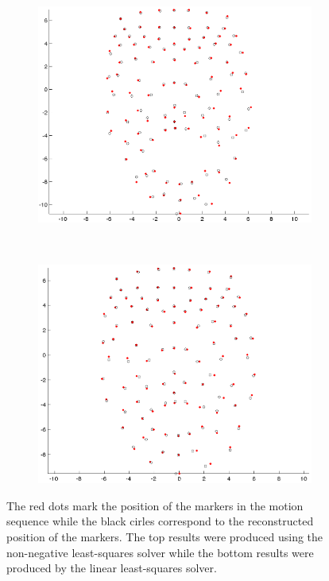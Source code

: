 \begin{figure}[htbp!]
\begin{subfigure}[b]{0.3\textwidth}
        \end{subfigure}%
        ~ %
        \begin{subfigure}[b]{0.3\textwidth}
                \includegraphics[width=\textwidth]{img/weights/3D/w3/w3_400.png}
        \end{subfigure}
        ~ %
        \begin{subfigure}[b]{0.3\textwidth}
                \includegraphics[width=\textwidth]{img/weights/3D/w3/w3_600.png} 
        \end{subfigure}
        \caption{The red dots mark the position of the markers in the motion sequence while the black cirles correspond to the reconstructed position of the markers. The top results were produced using the non-negative least-squares solver while the bottom results were produced by the linear least-squares solver. }\label{fig:errorw2w3}
\end{figure}

